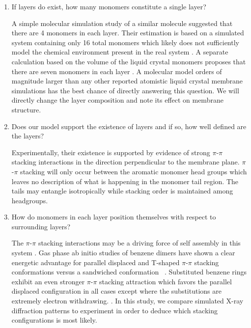 \documentclass{article}
\begin{document}
  \begin{enumerate}

  \item If layers do exist, how many monomers constitute a single layer? \label{point:monomernum}
  
  A simple molecular simulation study of a similar molecule suggested that
  there are 4 monomers in each layer. Their estimation is based on a simulated
  system containing only 16 total monomers which likely does not sufficiently
  model the chemical environment present in the real system
  \cite{zhu_methacrylated_2006}.  A separate calculation based on the volume of
  the liquid crystal monomers proposes that there are seven monomers in each
  layer \cite{resel_structural_2000}.  A molecular model orders of magnitude
  larger than any other reported atomistic liquid crystal membrane simulations
  has the best chance of directly answering this question.  We will directly
  change the layer composition and note its effect on membrane structure.

 \item Does our model support the existence of layers and if so, how well
 defined are the layers? \label{point:layers} 

  Experimentally, their existence is supported by evidence of strong $\pi$-$\pi$
  stacking interactions in the direction perpendicular to the membrane plane.
  $\pi$-$\pi$ stacking will only occur between the aromatic monomer head groups
  which leaves no description of what is happening in the monomer tail region.
  The tails may entangle isotropically while stacking order is maintained among
  headgroups. 

  \item How do monomers in each layer position themselves with respect to
  surrounding layers? \label{point:orientation}

  The $\pi$-$\pi$ stacking interactions may be a driving force of self assembly
  in this system \cite{gazit_possible_2002}. Gas phase ab initio studies of
  benzene dimers have shown a clear energetic advantage for parallel displaced
  and T-shaped $\pi$-$\pi$ stacking conformations versus a sandwiched
  conformation ~\cite{sinnokrot_estimates_2002}. Substituted benzene rings
  exhibit an even stronger $\pi$-$\pi$ stacking attraction which favors the
  parallel displaced configuration in all cases except where the substitutions
  are extremely electron withdrawing.
  \cite{waller_hybrid_2006,ringer_effect_2006}. In this study, we compare
  simulated X-ray diffraction patterns to experiment in order to deduce which
  stacking configurations is most likely. 


\end{enumerate}
\end{document}
